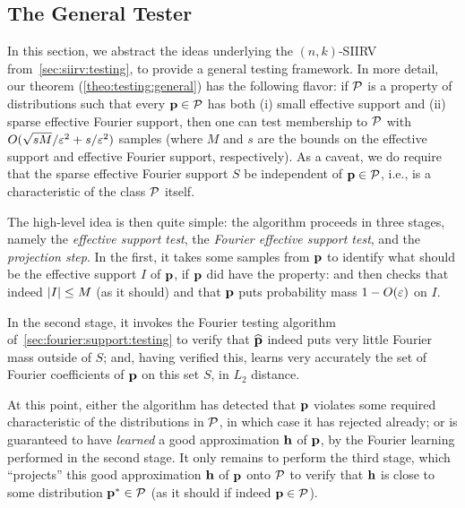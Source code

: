  
\subsection{The General Tester}\label{sec:general:testing}
In this section, we abstract the ideas underlying the $(n,k)$-SIIRV from~\cref{sec:siirv:testing}, to provide a general testing framework. In more detail, our theorem (\cref{theo:testing:general}) has the following flavor: if $\mathcal{P}$ is a property of distributions such that every $\mathbf{p}\in\mathcal{P}$ has both (i) small effective support and (ii) sparse effective Fourier support, then one can test membership to $\mathcal{P}$ with $O(\sqrt{sM}/\varepsilon^2+s/\varepsilon^2)$ samples (where $M$ and $s$ are the bounds on the effective support and effective Fourier support, respectively). As a caveat, we do require that the sparse effective Fourier support $S$ be independent of $\mathbf{p}\in\mathcal{P}$, i.e., is a characteristic of the class $\mathcal{P}$ itself.

The high-level idea is then quite simple: the algorithm proceeds in three stages, namely the \emph{effective support test}, the \emph{Fourier effective support test}, and the \emph{projection step}. In the first, it takes some samples from $\mathbf{p}$ to identify what should be the effective support $I$ of $\mathbf{p}$, if $\mathbf{p}$ did have the property: and then checks that indeed $\left\lvert I \right\rvert\leq M$ (as it should) and that $\mathbf{p}$ puts probability mass $1-O(\varepsilon)$ on $I$.

In the second stage, it invokes the Fourier testing algorithm of~\cref{sec:fourier:support:testing} to verify that $\widehat{\mathbf{p}}$ indeed puts very little Fourier mass outside of $S$; and, having verified this, learns very accurately the set of Fourier coefficients of $\mathbf{p}$ on this set $S$, in $L_2$ distance.

At this point, either the algorithm has detected that $\mathbf{p}$ violates some required characteristic of the distributions in $\mathcal{P}$, in which case it has rejected already; or is guaranteed to have \emph{learned} a good approximation $\mathbf{h}$ of $\mathbf{p}$, by the Fourier learning performed in the second stage. It only remains to perform the third stage, which ``projects'' this good approximation $\mathbf{h}$ of $\mathbf{p}$ onto $\mathcal{P}$ to verify that $\mathbf{h}$ is close to some distribution $\mathbf{p}^\ast\in\mathcal{P}$ (as it should if indeed $\mathbf{p}\in\mathcal{P}$).

